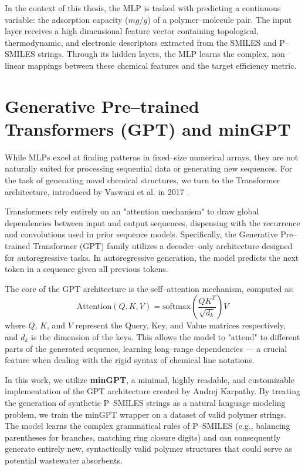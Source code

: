 In the context of this thesis, the MLP is tasked with predicting a continuous variable: the adsorption capacity ($mg/g$) of a polymer--molecule pair. The input layer receives a high dimensional feature vector containing topological, thermodynamic, and electronic descriptors extracted from the SMILES and P--SMILES strings. Through its hidden layers, the MLP learns the complex, non--linear mappings between these chemical features and the target efficiency metric.

\section{Generative Pre--trained Transformers (GPT) and minGPT}
\label{sec:mingpt}

While MLPs excel at finding patterns in fixed--size numerical arrays, they are not naturally suited for processing sequential data or generating new sequences. For the task of generating novel chemical structures, we turn to the Transformer architecture, introduced by Vaswani et al. in 2017 \cite{vaswani2017attention}.

Transformers rely entirely on an "attention mechanism" to draw global dependencies between input and output sequences, dispensing with the recurrence and convolutions used in prior sequence models. Specifically, the Generative Pre--trained Transformer (GPT) family \cite{radford2018improving} utilizes a decoder--only architecture designed for autoregressive tasks.  In autoregressive generation, the model predicts the next token in a sequence given all previous tokens.

The core of the GPT architecture is the self--attention mechanism, computed as:
\begin{equation}
	\text{Attention}(Q, K, V) = \text{softmax}\left(\frac{QK^T}{\sqrt{d_k}}\right)V
\end{equation}
where $Q$, $K$, and $V$ represent the Query, Key, and Value matrices respectively, and $d_k$ is the dimension of the keys. This allows the model to "attend" to different parts of the generated sequence, learning long--range dependencies — a crucial feature when dealing with the rigid syntax of chemical line notations.

In this work, we utilize \textbf{minGPT}, a minimal, highly readable, and customizable implementation of the GPT architecture created by Andrej Karpathy. By treating the generation of synthetic P--SMILES strings as a natural language modeling problem, we train the minGPT wrapper on a dataset of valid polymer strings. The model learns the complex grammatical rules of P--SMILES (e.g., balancing parentheses for branches, matching ring closure digits) and can consequently generate entirely new, syntactically valid polymer structures that could serve as potential wastewater absorbents.

